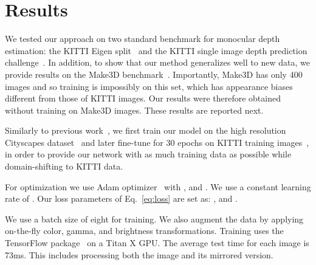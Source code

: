 \documentclass[10pt,twocolumn,letterpaper]{article}
\newcommand{\minisection}[1]{\vspace{1mm}\noindent{\textbf{#1}}}
\begin{document}
\section{Results}
We tested our approach on two standard benchmark for monocular depth estimation: the KITTI Eigen split~\cite{Geiger2012AreSuite} and the KITTI single image depth prediction challenge~\cite{uhrig2017sparsity}. In addition, to show that our method generalizes well to new data, we provide results on the Make3D benchmark~\cite{saxena2006learning,saxena20083}. Importantly, Make3D has only 400 images and so training is impossibly on this set, which has appearance biases different from those of KITTI images. Our results were therefore obtained without training on Make3D images. These results are reported next.

\minisection{Implementation details.}
Similarly to previous work~\cite{monodepth17,geonet}, we first train our model on the high resolution Cityscapes dataset~\cite{Cordts2016TheUnderstanding} and later fine-tune for 30 epochs on KITTI training images~\cite{Geiger2012AreSuite}, in order to provide our network with as much training data as possible while domain-shifting to KITTI data.

For optimization we use Adam optimizer~\cite{kingma2014adam} with ,  and . We use a constant learning rate of . Our loss parameters of Eq.~\eqref{eq:loss} are set as: ,  and .

We use a batch size of eight for training. We also augment the data by applying on-the-fly color, gamma, and brightness transformations. Training uses the TensorFlow package~\cite{abadi2016tensorflow} on a Titan X GPU. The average test time for each image is 73ms. This includes processing both the image and its mirrored version.


\setlength{\tabcolsep}{3pt}
\end{document}
